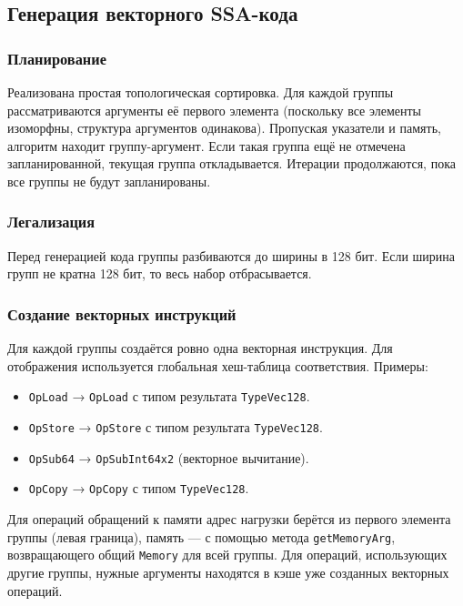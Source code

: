 \subsection{Генерация векторного SSA-кода}
\label{sec:codegen2}

\subsubsection{Планирование}

Реализована простая топологическая сортировка. Для каждой группы рассматриваются аргументы её первого элемента 
(поскольку все элементы изоморфны, структура аргументов одинакова). 
Пропуская указатели и память, алгоритм находит группу-аргумент. 
Если такая группа ещё не отмечена запланированной, текущая группа откладывается. 
Итерации продолжаются, пока все группы не будут запланированы.

\subsubsection{Легализация}

Перед генерацией кода группы разбиваются до ширины в 128 бит.
Если ширина групп не кратна 128 бит, то весь набор отбрасывается.

\subsubsection{Создание векторных инструкций}

Для каждой группы создаётся ровно одна векторная инструкция.
Для отображения используется глобальная хеш-таблица соответствия. Примеры:

\begin{itemize}
    \item \texttt{OpLoad} → \texttt{OpLoad} с типом результата \texttt{TypeVec128}.
    \item \texttt{OpStore} → \texttt{OpStore} с типом результата \texttt{TypeVec128}.
    \item \texttt{OpSub64} → \texttt{OpSubInt64x2} (векторное вычитание).
    \item \texttt{OpCopy} → \texttt{OpCopy} с типом \texttt{TypeVec128}.
\end{itemize}

Для операций обращений к памяти адрес нагрузки берётся из первого элемента группы (левая граница), память --- с помощью метода \texttt{getMemoryArg},
возвращающего общий \texttt{Memory} для всей группы.
Для операций, использующих другие группы, нужные аргументы находятся в кэше уже созданных векторных операций.

